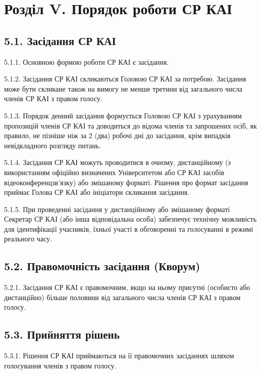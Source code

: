 \section*{Розділ V. Порядок роботи СР КАІ}

\subsection*{5.1. Засідання СР КАІ}
    5.1.1. Основною формою роботи СР КАІ є засідання.

    5.1.2. Засідання СР КАІ скликаються Головою СР КАІ за потребою. Засідання може бути скликане також на вимогу не менше третини від загального числа членів СР КАІ з правом голосу.

    5.1.3. Порядок денний засідання формується Головою СР КАІ з урахуванням пропозицій членів СР КАІ та доводиться до відома членів та запрошених осіб, як правило, не пізніше ніж за 2 (два) робочі дні до засідання, крім випадків невідкладного розгляду питань.

    5.1.4. Засідання СР КАІ можуть проводитися в очному, дистанційному (з використанням офіційно визначених Університетом або СР КАІ засобів відеоконференцзв'язку) або змішаному форматі. Рішення про формат засідання приймає Голова СР КАІ або ініціатори скликання засідання.

    5.1.5. При проведенні засідання у дистанційному або змішаному форматі Секретар СР КАІ (або інша відповідальна особа) забезпечує технічну можливість для ідентифікації учасників, їхньої участі в обговоренні та голосуванні в режимі реального часу.

\subsection*{5.2. Правомочність засідання (Кворум)}
    5.2.1. Засідання СР КАІ є правомочним, якщо на ньому присутні (особисто або дистанційно) більше половини від загального числа членів СР КАІ з правом голосу.

\subsection*{5.3. Прийняття рішень}
    5.3.1. Рішення СР КАІ приймаються на її правомочних засіданнях шляхом голосування членів з правом голосу.

